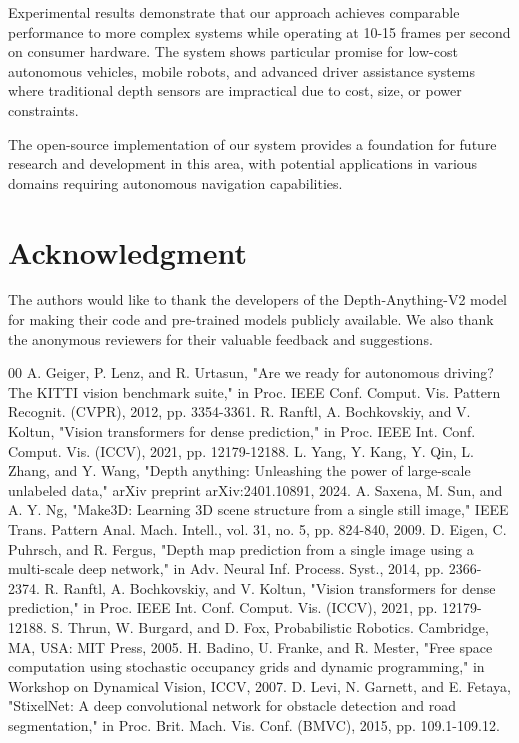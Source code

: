 \documentclass[conference]{IEEEtran}
\begin{document}
Experimental results demonstrate that our approach achieves comparable performance to more complex systems while operating at 10-15 frames per second on consumer hardware. The system shows particular promise for low-cost autonomous vehicles, mobile robots, and advanced driver assistance systems where traditional depth sensors are impractical due to cost, size, or power constraints.

The open-source implementation of our system provides a foundation for future research and development in this area, with potential applications in various domains requiring autonomous navigation capabilities.

\section*{Acknowledgment}
The authors would like to thank the developers of the Depth-Anything-V2 model for making their code and pre-trained models publicly available. We also thank the anonymous reviewers for their valuable feedback and suggestions.

\begin{thebibliography}{00}
 A. Geiger, P. Lenz, and R. Urtasun, "Are we ready for autonomous driving? The KITTI vision benchmark suite," in Proc. IEEE Conf. Comput. Vis. Pattern Recognit. (CVPR), 2012, pp. 3354-3361.
 R. Ranftl, A. Bochkovskiy, and V. Koltun, "Vision transformers for dense prediction," in Proc. IEEE Int. Conf. Comput. Vis. (ICCV), 2021, pp. 12179-12188.
 L. Yang, Y. Kang, Y. Qin, L. Zhang, and Y. Wang, "Depth anything: Unleashing the power of large-scale unlabeled data," arXiv preprint arXiv:2401.10891, 2024.
 A. Saxena, M. Sun, and A. Y. Ng, "Make3D: Learning 3D scene structure from a single still image," IEEE Trans. Pattern Anal. Mach. Intell., vol. 31, no. 5, pp. 824-840, 2009.
 D. Eigen, C. Puhrsch, and R. Fergus, "Depth map prediction from a single image using a multi-scale deep network," in Adv. Neural Inf. Process. Syst., 2014, pp. 2366-2374.
 R. Ranftl, A. Bochkovskiy, and V. Koltun, "Vision transformers for dense prediction," in Proc. IEEE Int. Conf. Comput. Vis. (ICCV), 2021, pp. 12179-12188.
 S. Thrun, W. Burgard, and D. Fox, Probabilistic Robotics. Cambridge, MA, USA: MIT Press, 2005.
 H. Badino, U. Franke, and R. Mester, "Free space computation using stochastic occupancy grids and dynamic programming," in Workshop on Dynamical Vision, ICCV, 2007.
 D. Levi, N. Garnett, and E. Fetaya, "StixelNet: A deep convolutional network for obstacle detection and road segmentation," in Proc. Brit. Mach. Vis. Conf. (BMVC), 2015, pp. 109.1-109.12.
\end{thebibliography}
\end{document}
